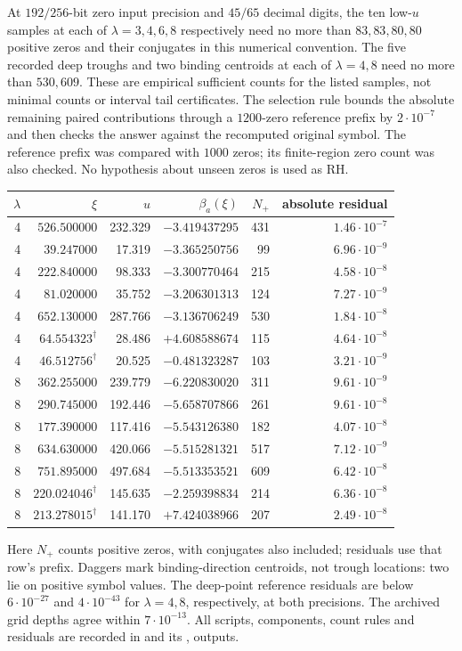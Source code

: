 \documentclass[11pt]{article}
\theoremstyle{remark}
\begin{document}
At $192/256$-bit zero input precision and $45/65$ decimal digits, the
ten low-$u$ samples at each of $\lambda=3,4,6,8$ respectively need
no more than $83,83,80,80$ positive zeros and their conjugates in this
numerical convention. The five recorded deep troughs and two binding
centroids at each of $\lambda=4,8$ need no more than $530,609$.
These are empirical sufficient counts for the listed samples, not
minimal counts or interval tail certificates. The selection rule
bounds the absolute remaining paired contributions through a
$1200$-zero reference prefix by $2\cdot10^{-7}$ and then checks the
answer against the recomputed original symbol. The reference prefix
was compared with $1000$ zeros; its finite-region zero count was
also checked. No hypothesis about unseen zeros is used as RH.

\begin{center}
\small
\begin{tabular}{rrrrrr}
$\lambda$&$\xi$&$u$&$\beta_a(\xi)$&$N_+$&absolute residual\\\hline
4&$526.500000$&232.329&$-3.419437295$&431&$1.46\cdot10^{-7}$\\
4&$39.247000$&17.319&$-3.365250756$&99&$6.96\cdot10^{-9}$\\
4&$222.840000$&98.333&$-3.300770464$&215&$4.58\cdot10^{-8}$\\
4&$81.020000$&35.752&$-3.206301313$&124&$7.27\cdot10^{-9}$\\
4&$652.130000$&287.766&$-3.136706249$&530&$1.84\cdot10^{-8}$\\
4&$64.554323^{\dagger}$&28.486&$+4.608588674$&115&$4.64\cdot10^{-8}$\\
4&$46.512756^{\dagger}$&20.525&$-0.481323287$&103&$3.21\cdot10^{-9}$\\
8&$362.255000$&239.779&$-6.220830020$&311&$9.61\cdot10^{-9}$\\
8&$290.745000$&192.446&$-5.658707866$&261&$9.61\cdot10^{-8}$\\
8&$177.390000$&117.416&$-5.543126380$&182&$4.07\cdot10^{-8}$\\
8&$634.630000$&420.066&$-5.515281321$&517&$7.12\cdot10^{-9}$\\
8&$751.895000$&497.684&$-5.513353521$&609&$6.42\cdot10^{-8}$\\
8&$220.024046^{\dagger}$&145.635&$-2.259398834$&214&$6.36\cdot10^{-8}$\\
8&$213.278015^{\dagger}$&141.170&$+7.424038966$&207&$2.49\cdot10^{-8}$\\
\end{tabular}
\end{center}
Here $N_+$ counts positive zeros, with conjugates also included;
residuals use that row's prefix. Daggers mark binding-direction
centroids, not trough locations: two lie on positive symbol values.
The deep-point reference residuals are below $6\cdot10^{-27}$ and
$4\cdot10^{-43}$ for $\lambda=4,8$, respectively, at both precisions.
The archived grid depths agree within $7\cdot10^{-13}$.
All scripts, components, count rules and residuals are recorded in
 and its
,  outputs.
\end{document}
